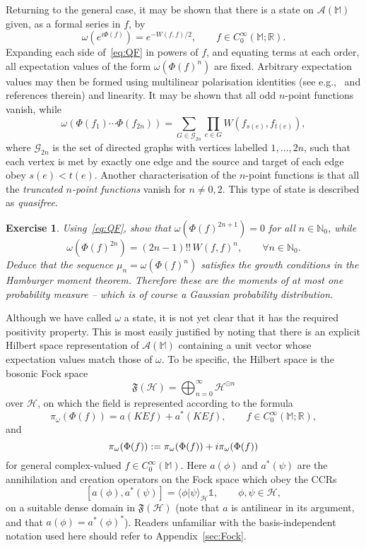 \documentclass[12pt]{article}
\let\Re\relax
\let\Im\relax
\DeclareMathOperator{\Re}{Re}
\DeclareMathOperator{\Im}{Im}
\newcommand{\1}{\mathds{1}}                         %
\newcommand{\NN}{\mathbb{N}}          %
\newcommand{\RR}{\mathbb{R}}           %
\newcommand{\MM}{\mathbb{M}}
\newcommand{\FF}{{\mathfrak{F}}}
\newcommand{\HH}{{\mathcal{H}}}
\newcommand{\II}{{\mathbb{1}}}
\newcommand{\Ac}{{\mathcal{A}}}
\newcommand{\CoinX}[1]{C_0^\infty(#1)}
\newcommand{\ip}[2]{\langle #1|#2\rangle}
\newtheorem{exercise}[theorem]{Exercise}
\begin{document}
Returning to the general case, it may be shown that there is a state on $\Ac(\MM)$ given, as a formal series in $f$, by 
\begin{equation}\label{eq:QF}
\omega (e^{i\Phi(f)}) = e^{-W(f,f)/2},\qquad f\in\CoinX{\MM;\RR}.
\end{equation}
Expanding each side of~\eqref{eq:QF} in powers of $f$, and equating terms at each order, all expectation values of the form $\omega(\Phi(f)^n)$ are fixed. Arbitrary expectation values may then be formed using multilinear polarisation identities (see e.g.,~\cite{Thomas:2014} and references therein) and linearity.
It may be shown that all odd $n$-point functions vanish, while
\[
\omega(\Phi(f_1)\cdots\Phi(f_{2n}))= \sum_{G\in\mathcal{G}_{2n}} \prod_{e\in G}
W(f_{s(e)},f_{t(e)}),
\]
where $\mathcal{G}_{2n}$ is the set of directed graphs with vertices labelled $1,\ldots,2n$, such that each vertex is met by exactly one edge and the source and target of each edge obey $s(e)<t(e)$. Another characterisation of the $n$-point functions is that all the \emph{truncated $n$-point functions} vanish for $n\neq 0,2$.
This type of state is described as \emph{quasifree}. 
\begin{exercise}
	Using~\eqref{eq:QF}, show that $\omega(\Phi(f)^{2n+1})=0$ for all $n\in\NN_0$, while 
	\[
	\omega(\Phi(f)^{2n}) = (2n-1)!!\, W(f,f)^n, \qquad\forall n\in\NN_0.
	\]
	Deduce that the sequence $\mu_n = \omega(\Phi(f)^n)$ satisfies the growth conditions in the Hamburger moment theorem. Therefore these are the moments of at most one probability measure -- which is of course a Gaussian probability distribution.
\end{exercise}

Although we have called $\omega$ a state, it is not yet clear that it has the required positivity property. This is most easily justified by noting that there is an explicit Hilbert space representation of $\Ac(\MM)$ containing a unit vector whose expectation values match those of $\omega$. To be specific, the Hilbert space is
the bosonic Fock space 
\begin{equation}\label{eq:qfF}
\FF(\HH) = \bigoplus_{n=0}^\infty \HH^{\odot n}
\end{equation}
over $\HH$, on which the field is represented according to the formula
\begin{equation}\label{eq:qfpi}
\pi_\omega(\Phi(f)) = a(KE f) + a^*(KEf)  ,\qquad f\in\CoinX{\MM;\RR},
\end{equation}
and
\[
\pi_\omega(\Phi(f)):=\pi_\omega(\Phi(\Re f)) + i\pi_\omega(\Phi(\Im f))
\]
for general complex-valued $f\in\CoinX{\MM}$.
Here $a(\phi)$ and $a^*(\psi)$ are the annihilation and creation operators on the Fock space which obey the CCRs
\begin{equation}\label{eq:CCRs}
[a(\phi),a^*(\psi)] = \ip{\phi}{\psi}_\HH\II, \qquad \phi,\psi\in\HH,
\end{equation}
on a suitable dense domain in $\FF(\HH)$ 
(note that $a$ is antilinear in its argument, and that $a(\phi)=a^*(\phi)^*$). Readers unfamiliar with the basis-independent notation used here should refer to Appendix~\ref{sec:Fock}. 
\end{document}
